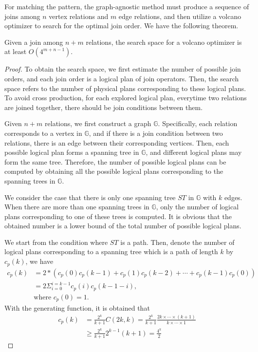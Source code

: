 For matching the pattern, the graph-agnostic method must produce a sequence of joins among $n$ vertex relations and $m$ edge relations, and then utilize a volcano optimizer to search for the optimal join order. We have the following theorem.

\begin{theorem}
    \label{thm:complexity-of-volcano}
    Given a join among $n + m$ relations, the search space for a volcano optimizer is at least $O(4^{m+n-1})$.
\end{theorem}

\begin{proof}
    To obtain the search space, we first estimate the number of possible join orders, and each join order is a logical plan of join operators.
    Then, the search space refers to the number of physical plans corresponding to these logical plans.
    To avoid cross production, for each explored logical plan, everytime two relations are joined together, there should be join conditions between them.

    Given $n + m$ relations, we first construct a graph $\mathbb{G}$.
    Specifically, each relation corresponds to a vertex in $\mathbb{G}$, and if there is a join condition between two relations, there is an edge between their corresponding vertices.
    Then, each possible logical plan forms a spanning tree in $\mathbb{G}$, and different logical plans may form the same tree.
    Therefore, the number of possible logical plans can be computed by obtaining all the possible logical plans corresponding to the spanning trees in $\mathbb{G}$.

    We consider the case that there is only one spanning tree $ST$ in $\mathbb{G}$ with $k$ edges.
    When there are more than one spanning trees in $\mathbb{G}$, only the number of logical plans corresponding to one of these trees is computed.
    It is obvious that the obtained number is a lower bound of the total number of possible logical plans.

    We start from the condition where $ST$ is a path.
    Then, denote the number of logical plans corresponding to a spanning tree which is a path of length $k$ by $c_p(k)$, we have
    \begin{equation*}
        \begin{split}
            c_p(k) & = 2 * (c_p(0)c_p(k-1) + c_p(1)c_p(k-2) + \cdots + c_p(k-1)c_p(0)) \\
            & = 2\Sigma_{i=0}^{i=k-1}c_p(i)c_p(k-1-i), \\
            & \text{where } c_p(0) = 1.
        \end{split}
    \end{equation*}
    With the generating function, it is obtained that
    \begin{equation*}
        \begin{split}
            c_p(k) & = \frac{2^k}{k+1}C(2k, k) = \frac{2^k}{k+1}\frac{2k \times \cdots \times (k+1)}{k \times \cdots \times 1} \\
            & \geq \frac{2^k}{k+1}2^{k-1}(k+1) = \frac{4^k}{2}
        \end{split}
    \end{equation*}


\end{proof}
